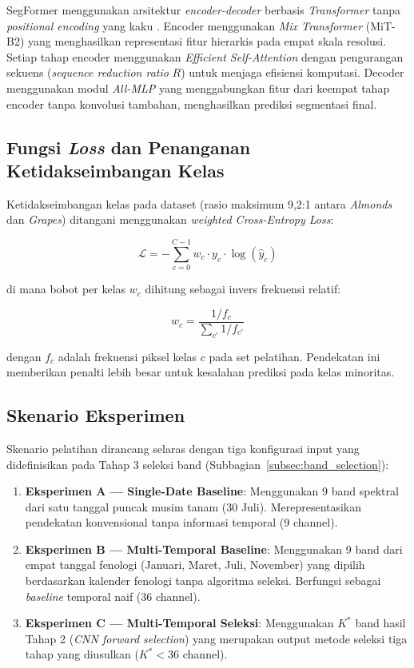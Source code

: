 SegFormer menggunakan arsitektur \textit{encoder-decoder} berbasis \textit{Transformer} tanpa \textit{positional encoding} yang kaku \citep{xie2021}. Encoder menggunakan \textit{Mix Transformer} (MiT-B2) yang menghasilkan representasi fitur hierarkis pada empat skala resolusi. Setiap tahap encoder menggunakan \textit{Efficient Self-Attention} dengan pengurangan sekuens (\textit{sequence reduction ratio} $R$) untuk menjaga efisiensi komputasi. Decoder menggunakan modul \textit{All-MLP} yang menggabungkan fitur dari keempat tahap encoder tanpa konvolusi tambahan, menghasilkan prediksi segmentasi final.

\subsection{Fungsi \textit{Loss} dan Penanganan Ketidakseimbangan Kelas}

Ketidakseimbangan kelas pada dataset (rasio maksimum 9,2:1 antara \textit{Almonds} dan \textit{Grapes}) ditangani menggunakan \textit{weighted Cross-Entropy Loss}:

\begin{equation}
    \mathcal{L} = -\sum_{c=0}^{C-1} w_c \cdot y_c \cdot \log(\hat{y}_c)
\end{equation}

di mana bobot per kelas $w_c$ dihitung sebagai invers frekuensi relatif:

\begin{equation}
    w_c = \frac{1 / f_c}{\sum_{c'} 1 / f_{c'}}
\end{equation}

dengan $f_c$ adalah frekuensi piksel kelas $c$ pada set pelatihan. Pendekatan ini memberikan penalti lebih besar untuk kesalahan prediksi pada kelas minoritas.

\subsection{Skenario Eksperimen}

Skenario pelatihan dirancang selaras dengan tiga konfigurasi input yang didefinisikan pada Tahap 3 seleksi band (Subbagian~\ref{subsec:band_selection}):

\begin{enumerate}
    \item \textbf{Eksperimen A — Single-Date Baseline}: Menggunakan 9 band spektral dari satu tanggal puncak musim tanam (30 Juli). Merepresentasikan pendekatan konvensional tanpa informasi temporal (9 channel).

    \item \textbf{Eksperimen B — Multi-Temporal Baseline}: Menggunakan 9 band dari empat tanggal fenologi (Januari, Maret, Juli, November) yang dipilih berdasarkan kalender fenologi tanpa algoritma seleksi. Berfungsi sebagai \textit{baseline} temporal naif (36 channel).

    \item \textbf{Eksperimen C — Multi-Temporal Seleksi}: Menggunakan $K^*$ band hasil Tahap 2 (\textit{CNN forward selection}) yang merupakan output metode seleksi tiga tahap yang diusulkan ($K^* < 36$ channel).
\end{enumerate}

